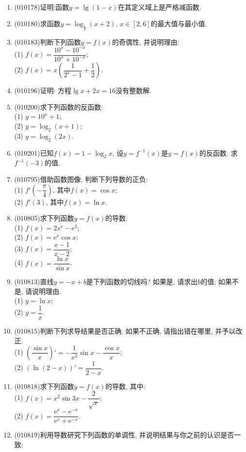 \documentclass[10pt,a4paper]{article}
\begin{document}
\begin{enumerate}[1.]
(5) $f(x)=\lg\dfrac {1-x}{1+x}$.
\item {\tiny (010178)}证明:函数$y=\lg (1-x)$在其定义域上是严格减函数.
\item {\tiny (010180)}求函数$y=\log_{\frac 12}(x+2)$, $x\in [2, 6]$的最大值与最小值.
\item {\tiny (010183)}判断下列函数$y=f(x)$的奇偶性, 并说明理由:\\
(1) $f(x)=\dfrac{10^x-10^{-x}}{10^x+10^{-x}}$;\\
(2) $f(x)=x(\dfrac 1{2^x-1}+\dfrac 12)$.
\item {\tiny (010196)}证明: 方程$\lg x+2x=16$没有整数解.
\item {\tiny (010200)}求下列函数的反函数:\\
(1) $y=10^x+1$;\\
(2) $y=\log_2(x+1)$;\\
(3) $y=\log_2(2x)$.
\item {\tiny (010201)}已知$f(x)=1-\log_2x$, 设$y=f^{-1}(x)$是$y=f(x)$的反函数. 求$f^{-1}(-3)$的值.
\item {\tiny (010795)}借助函数图像, 判断下列导数的正负:\\
(1) $f'(-\dfrac \pi 4)$, 其中$f(x)=\cos x$;\\
(2) $f'(3)$, 其中$f(x)=\ln x$.
\item {\tiny (010805)}求下列函数$y=f(x)$的导数:\\
(1) $f(x)=2x^{\mathrm{e}}-\mathrm{e}^2$;\\
(2) $f(x)=\mathrm{e}^x\cos x$;\\
(3) $f(x)=\dfrac{x-1}{x-2}$;\\
(4) $f(x)=\dfrac{\ln x}{\sin x}$.
\item {\tiny (010813)}直线$y=-x+b$是下列函数的切线吗? 如果是, 请求出$b$的值; 如果不是, 请说明理由.\\
(1) $y=\ln x$;\\
(2) $y=\dfrac 1x$.
\item {\tiny (010815)}判断下列求导结果是否正确. 如果不正确, 请指出错在哪里, 并予以改正.\\
(1) $(\dfrac{\sin x}x)'=-\dfrac 1{x^2}\sin x-\dfrac{\cos x}x$;\\
(2) $(\ln (2-x))'=\dfrac 1{2-x}$.
\item {\tiny (010818)}求下列函数$y=f(x)$的导数, 其中:\\
(1) $f(x)=x^2\sin 3x-\dfrac 2{\sqrt x}$;\\
(2) $f(x)=\dfrac{\mathrm{e}^x-\mathrm{e}^{-x}}{\mathrm{e}^x+\mathrm{e}^{-x}}$.
\item {\tiny (010819)}利用导数研究下列函数的单调性, 并说明结果与你之前的认识是否一致:\\

\end{enumerate}
\end{document}
